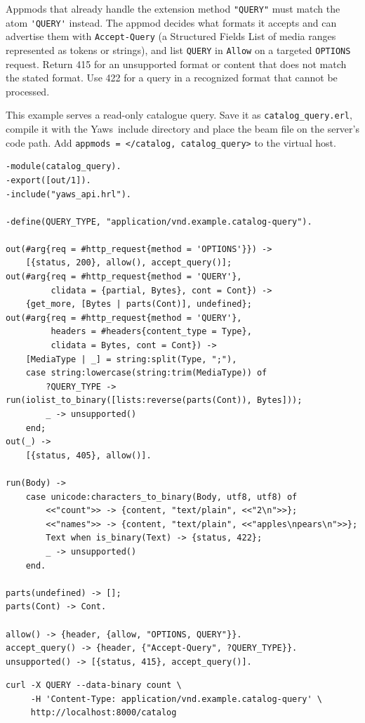 \documentclass[11pt,oneside,english]{book}
\newcommand{\Yaws}            %
        {{\sc Yaws}}
\begin{document}
Appmods that already handle the extension method \verb+"QUERY"+ must match
the atom \verb+'QUERY'+ instead. The appmod decides what formats it accepts
and can advertise them with \verb+Accept-Query+ (a Structured Fields List
of media ranges represented as tokens or strings), and list \verb+QUERY+ in
\verb+Allow+ on a targeted \verb+OPTIONS+ request. Return 415 for an
unsupported format or content that does not match the stated format. Use
422 for a query in a recognized format that cannot be processed.

This example serves a read-only catalogue query. Save it as
\verb+catalog_query.erl+, compile it with the \Yaws\ include directory and
place the beam file on the server's code path. Add
\verb+appmods = </catalog, catalog_query>+ to the virtual host.

\begin{verbatim}
-module(catalog_query).
-export([out/1]).
-include("yaws_api.hrl").

-define(QUERY_TYPE, "application/vnd.example.catalog-query").

out(#arg{req = #http_request{method = 'OPTIONS'}}) ->
    [{status, 200}, allow(), accept_query()];
out(#arg{req = #http_request{method = 'QUERY'},
         clidata = {partial, Bytes}, cont = Cont}) ->
    {get_more, [Bytes | parts(Cont)], undefined};
out(#arg{req = #http_request{method = 'QUERY'},
         headers = #headers{content_type = Type},
         clidata = Bytes, cont = Cont}) ->
    [MediaType | _] = string:split(Type, ";"),
    case string:lowercase(string:trim(MediaType)) of
        ?QUERY_TYPE -> run(iolist_to_binary([lists:reverse(parts(Cont)), Bytes]));
        _ -> unsupported()
    end;
out(_) ->
    [{status, 405}, allow()].

run(Body) ->
    case unicode:characters_to_binary(Body, utf8, utf8) of
        <<"count">> -> {content, "text/plain", <<"2\n">>};
        <<"names">> -> {content, "text/plain", <<"apples\npears\n">>};
        Text when is_binary(Text) -> {status, 422};
        _ -> unsupported()
    end.

parts(undefined) -> [];
parts(Cont) -> Cont.

allow() -> {header, {allow, "OPTIONS, QUERY"}}.
accept_query() -> {header, {"Accept-Query", ?QUERY_TYPE}}.
unsupported() -> [{status, 415}, accept_query()].
\end{verbatim}

\begin{verbatim}
curl -X QUERY --data-binary count \
     -H 'Content-Type: application/vnd.example.catalog-query' \
     http://localhost:8000/catalog
\end{verbatim}
\end{document}
